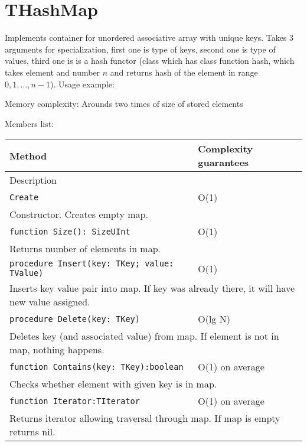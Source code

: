 \chapter{THashMap}

Implements container for unordered associative array with unique keys.
Takes 3 arguments for specialization, first one is type of keys, second one is type of values, third
one is is a hash functor
(class which has class function hash, which takes element and number $n$ and returns hash of the
element in range $0, 1, \dots, n-1$). 
Usage example:



Memory complexity:
Arounds two times of size of stored elements 

Members list:

\begin{longtable}{|m{10cm}|m{5cm}|}
\hline
Method & Complexity guarantees \\ \hline
\multicolumn{2}{|m{15cm}|}{Description} \\ \hline\hline

\verb!Create! & O(1) \\ \hline
\multicolumn{2}{|m{15cm}|}{Constructor. Creates empty map.} \\ \hline\hline

\verb!function Size(): SizeUInt! & O(1) \\ \hline
\multicolumn{2}{|m{15cm}|}{Returns number of elements in map.} \\\hline\hline

\verb!procedure Insert(key: TKey; value: TValue)! &
O(1)  \\ \hline
\multicolumn{2}{|m{15cm}|}{Inserts key value pair into map. If key was already there, it will have
new value assigned.} \\\hline\hline

\verb!procedure Delete(key: TKey)! &
O(lg N) \\ \hline
\multicolumn{2}{|m{15cm}|}{Deletes key (and associated value) from map. If element is not in map, nothing happens.} \\\hline\hline

\verb!function Contains(key: TKey):boolean! & O(1) on average \\\hline
\multicolumn{2}{|m{15cm}|}{Checks whether element with given key is in map.} \\\hline\hline

\verb!function Iterator:TIterator! & O(1) on average \\\hline
\multicolumn{2}{|m{15cm}|}{Returns iterator allowing traversal through map. If map is empty returns nil.} \\\hline\hline


\end{longtable}
